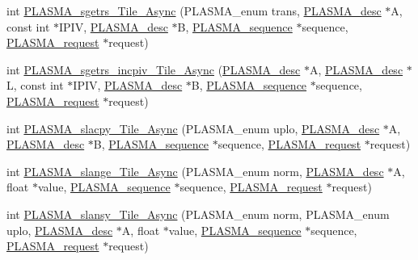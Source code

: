 \begin{DoxyCompactItemize}
\item 
int \hyperlink{group__float__Tile__Async_ga89f118911b8b996c80ab0ba9c2f7b369_ga89f118911b8b996c80ab0ba9c2f7b369}{P\+L\+A\+S\+M\+A\+\_\+sgetrs\+\_\+\+Tile\+\_\+\+Async} (P\+L\+A\+S\+M\+A\+\_\+enum trans, \hyperlink{structplasma__desc__t}{P\+L\+A\+S\+M\+A\+\_\+desc} $\ast$A, const int $\ast$I\+P\+I\+V, \hyperlink{structplasma__desc__t}{P\+L\+A\+S\+M\+A\+\_\+desc} $\ast$B, \hyperlink{structplasma__sequence__t}{P\+L\+A\+S\+M\+A\+\_\+sequence} $\ast$sequence, \hyperlink{structplasma__request__t}{P\+L\+A\+S\+M\+A\+\_\+request} $\ast$request)
\item 
int \hyperlink{group__float__Tile__Async_ga7689f3c883479e874b034ef9bce467a8_ga7689f3c883479e874b034ef9bce467a8}{P\+L\+A\+S\+M\+A\+\_\+sgetrs\+\_\+incpiv\+\_\+\+Tile\+\_\+\+Async} (\hyperlink{structplasma__desc__t}{P\+L\+A\+S\+M\+A\+\_\+desc} $\ast$A, \hyperlink{structplasma__desc__t}{P\+L\+A\+S\+M\+A\+\_\+desc} $\ast$L, const int $\ast$I\+P\+I\+V, \hyperlink{structplasma__desc__t}{P\+L\+A\+S\+M\+A\+\_\+desc} $\ast$B, \hyperlink{structplasma__sequence__t}{P\+L\+A\+S\+M\+A\+\_\+sequence} $\ast$sequence, \hyperlink{structplasma__request__t}{P\+L\+A\+S\+M\+A\+\_\+request} $\ast$request)
\item 
int \hyperlink{group__float__Tile__Async_gacb8f83fe97e9c2528882d6047fb17bc0_gacb8f83fe97e9c2528882d6047fb17bc0}{P\+L\+A\+S\+M\+A\+\_\+slacpy\+\_\+\+Tile\+\_\+\+Async} (P\+L\+A\+S\+M\+A\+\_\+enum uplo, \hyperlink{structplasma__desc__t}{P\+L\+A\+S\+M\+A\+\_\+desc} $\ast$A, \hyperlink{structplasma__desc__t}{P\+L\+A\+S\+M\+A\+\_\+desc} $\ast$B, \hyperlink{structplasma__sequence__t}{P\+L\+A\+S\+M\+A\+\_\+sequence} $\ast$sequence, \hyperlink{structplasma__request__t}{P\+L\+A\+S\+M\+A\+\_\+request} $\ast$request)
\item 
int \hyperlink{group__float__Tile__Async_gaba19b4320b156b021b3f7cca09e5f9bd_gaba19b4320b156b021b3f7cca09e5f9bd}{P\+L\+A\+S\+M\+A\+\_\+slange\+\_\+\+Tile\+\_\+\+Async} (P\+L\+A\+S\+M\+A\+\_\+enum norm, \hyperlink{structplasma__desc__t}{P\+L\+A\+S\+M\+A\+\_\+desc} $\ast$A, float $\ast$value, \hyperlink{structplasma__sequence__t}{P\+L\+A\+S\+M\+A\+\_\+sequence} $\ast$sequence, \hyperlink{structplasma__request__t}{P\+L\+A\+S\+M\+A\+\_\+request} $\ast$request)
\item 
int \hyperlink{group__float__Tile__Async_ga86b3d7267a86e5a2389a5aab0e1d96f2_ga86b3d7267a86e5a2389a5aab0e1d96f2}{P\+L\+A\+S\+M\+A\+\_\+slansy\+\_\+\+Tile\+\_\+\+Async} (P\+L\+A\+S\+M\+A\+\_\+enum norm, P\+L\+A\+S\+M\+A\+\_\+enum uplo, \hyperlink{structplasma__desc__t}{P\+L\+A\+S\+M\+A\+\_\+desc} $\ast$A, float $\ast$value, \hyperlink{structplasma__sequence__t}{P\+L\+A\+S\+M\+A\+\_\+sequence} $\ast$sequence, \hyperlink{structplasma__request__t}{P\+L\+A\+S\+M\+A\+\_\+request} $\ast$request)

\end{DoxyCompactItemize}
